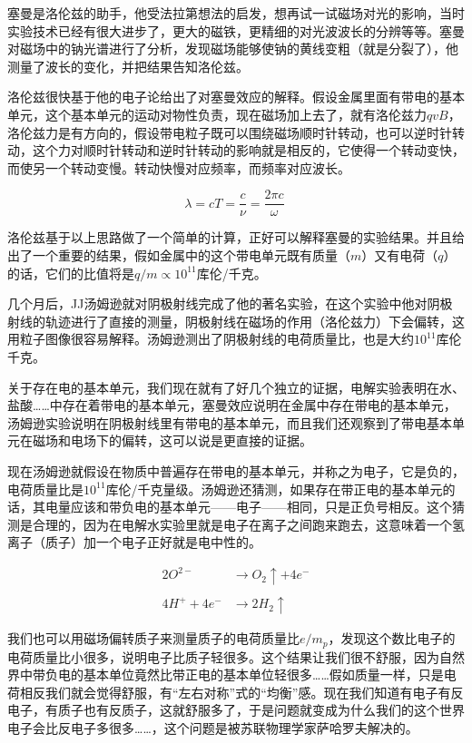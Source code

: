 塞曼是洛伦兹的助手，他受法拉第想法的启发，想再试一试磁场对光的影响，当时实验技术已经有很大进步了，更大的磁铁，更精细的对光波波长的分辨等等。塞曼对磁场中的钠光谱进行了分析，发现磁场能够使钠的黄线变粗（就是分裂了），他测量了波长的变化，并把结果告知洛伦兹。

洛伦兹很快基于他的电子论给出了对塞曼效应的解释。假设金属里面有带电的基本单元，这个基本单元的运动对物性负责，现在磁场加上去了，就有洛伦兹力$q v B$，洛伦兹力是有方向的，假设带电粒子既可以围绕磁场顺时针转动，也可以逆时针转动，这个力对顺时针转动和逆时针转动的影响就是相反的，它使得一个转动变快，而使另一个转动变慢。转动快慢对应频率，而频率对应波长。

\begin{equation}
\lambda = c T = \frac{c }{\nu} = \frac{2 \pi c}{ \omega }~
\end{equation}

洛伦兹基于以上思路做了一个简单的计算，正好可以解释塞曼的实验结果。并且给出了一个重要的结果，假如金属中的这个带电单元既有质量（$m$）又有电荷（$q$）的话，它们的比值将是$q/m \propto 10^{11} $库伦/千克。

几个月后，JJ汤姆逊就对阴极射线完成了他的著名实验，在这个实验中他对阴极射线的轨迹进行了直接的测量，阴极射线在磁场的作用（洛伦兹力）下会偏转，这用粒子图像很容易解释。汤姆逊测出了阴极射线的电荷质量比，也是大约$10^{11}$库伦千克。

关于存在电的基本单元，我们现在就有了好几个独立的证据，电解实验表明在水、盐酸……中存在着带电的基本单元，塞曼效应说明在金属中存在带电的基本单元，汤姆逊实验说明在阴极射线里有带电的基本单元，而且我们还观察到了带电基本单元在磁场和电场下的偏转，这可以说是更直接的证据。

现在汤姆逊就假设在物质中普遍存在带电的基本单元，并称之为电子，它是负的，电荷质量比是$10^{11}$库伦/千克量级。汤姆逊还猜测，如果存在带正电的基本单元的话，其电量应该和带负电的基本单元——电子——相同，只是正负号相反。这个猜测是合理的，因为在电解水实验里就是电子在离子之间跑来跑去，这意味着一个氢离子（质子）加一个电子正好就是电中性的。

\begin{align}
2O^{2-} & \rightarrow O_2 \uparrow + 4e^- \\\\
4H^+ + 4e^- & \rightarrow 2H_2 \uparrow~
\end{align}


我们也可以用磁场偏转质子来测量质子的电荷质量比$e/m_p$，发现这个数比电子的电荷质量比小很多，说明电子比质子轻很多。这个结果让我们很不舒服，因为自然界中带负电的基本单位竟然比带正电的基本单位轻很多……假如质量一样，只是电荷相反我们就会觉得舒服，有“左右对称”式的“均衡”感。现在我们知道有电子有反电子，有质子也有反质子，这就舒服多了，于是问题就变成为什么我们的这个世界电子会比反电子多很多……，这个问题是被苏联物理学家萨哈罗夫解决的。

